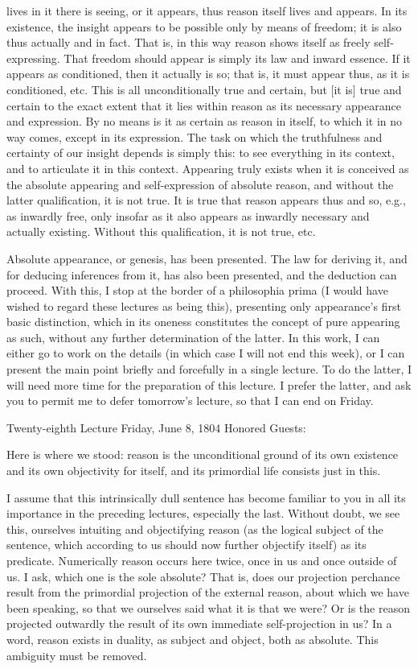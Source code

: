 lives in it there is seeing,
or it appears, thus reason itself lives and appears.
In its existence, the insight appears
to be possible only by means of freedom;
it is also thus actually and in fact.
That is, in this way reason shows itself
as freely self-expressing.
That freedom should appear is
simply its law and inward essence.
If it appears as conditioned, then it actually is so;
that is, it must appear thus, as it is conditioned, etc.
This is all unconditionally true and certain,
but [it is] true and certain to the exact extent
that it lies within reason
as its necessary appearance and expression.
By no means is it as certain as reason in itself,
to which it in no way comes, except in its expression.
The task on which the truthfulness and certainty
of our insight depends is simply this:
to see everything in its context,
and to articulate it in this context.
Appearing truly exists
when it is conceived
as the absolute appearing
and self-expression of absolute reason,
and without the latter qualification,
it is not true.
It is true that reason appears thus and so,
e.g., as inwardly free,
only insofar as it also appears
as inwardly necessary and actually existing.
Without this qualification, it is not true, etc.

Absolute appearance, or genesis,
has been presented.
The law for deriving it,
and for deducing inferences from it,
has also been presented,
and the deduction can proceed.
With this, I stop at the border
of a philosophia prima
(I would have wished to regard
these lectures as being this),
presenting only appearance’s
first basic distinction,
which in its oneness constitutes
the concept of pure appearing as such,
without any further determination of the latter.
In this work, I can either go to work on the details
(in which case I will not end this week),
or I can present the main point
briefly and forcefully
in a single lecture.
To do the latter, I will need more time
for the preparation of this lecture.
I prefer the latter, and ask you to
permit me to defer tomorrow’s lecture,
so that I can end on Friday.

Twenty-eighth Lecture
Friday, June 8, 1804
Honored Guests:

Here is where we stood:
reason is the unconditional ground of its own existence
and its own objectivity for itself,
and its primordial life consists just in this.

I assume that this intrinsically dull sentence has
become familiar to you in all its importance
in the preceding lectures, especially the last.
Without doubt, we see this,
ourselves intuiting and objectifying reason
(as the logical subject of the sentence,
which according to us should now
further objectify itself)
as its predicate.
Numerically reason occurs here twice,
once in us and once outside of us.
I ask, which one is the sole absolute?
That is, does our projection perchance result
from the primordial projection of the external reason,
about which we have been speaking,
so that we ourselves said what it is that we were?
Or is the reason projected outwardly the result
of its own immediate self-projection in us?
In a word, reason exists in duality,
as subject and object,
both as absolute.
This ambiguity must be removed.

